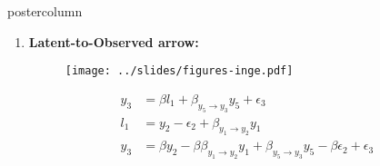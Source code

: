 \documentclass{beamer}
\begin{document}
\begin{frame}
\begin{columns}
\begin{column}{.33\textwidth}
\begin{beamercolorbox}[center]{postercolumn}
\begin{minipage}{.98\textwidth}
{\begin{myblock}{}
	\end{myblock} \vfill
	\begin{myblock}{}
		\begin{enumerate}
			\item \textbf{Latent-to-Observed arrow:}
				\begin{figure}
					\centering
					\texttt{[image: ../slides/figures-inge.pdf]}
					\label{fig:l2o_lat_obs}
				\end{figure}
				\begin{equation*}
					\begin{split}
						y_3 &= \beta l_1 + \beta_{y_5 \to y_3} y_5 + \epsilon_3 \\
						l_1 &= y_2 - \epsilon_{2} + \beta_{y_1 \to y_2} y_1 \\
						y_3 &= \beta y_2 - \beta \beta_{y_1 \to y_2} y_1 + \beta_{y_5 \to y_3} y_5 - \beta \epsilon_2 + \epsilon_3\\
					\end{split}
				\end{equation*}
		\end{enumerate}
	\end{myblock}\vfill
		}\end{minipage}\end{beamercolorbox}
	\end{column}



\end{columns}
\end{frame}
\end{document}

